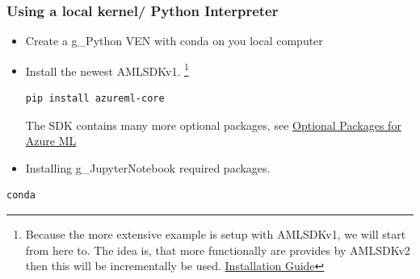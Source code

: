 \subsubsection{Using a local kernel/ Python Interpreter}

\begin{itemize}
	\item Create a \gls{g_Python} \gls{VEN} with conda on you local computer
	\item Install the newest \gls{AMLSDKv1}.
	\footnote{
	Because the more extensive example is setup with \gls{AMLSDKv1}, we will start from here to. The idea is, that more functionally are provides by \gls{AMLSDKv2} then this will be incrementally be used. \href{https://learn.microsoft.com/en-us/python/api/overview/azure/ml/install?view=azure-ml-py}{Installation Guide}
}
	\begin{lstlisting}[style=CMD, caption={Installing Azure ML SDK core package},captionpos=b]
		pip install azureml-core
	\end{lstlisting}
	The \gls{SDK} contains many more optional packages, see \href{https://learn.microsoft.com/en-us/python/api/overview/azure/ml/install?view=azure-ml-py}{Optional Packages for Azure ML}
	\item Installing \gls{g_JupyterNotebook} required packages.
\end{itemize}

\begin{lstlisting}[style=CMD, caption={Installing Azure ML SDK core package},captionpos=b]
	conda 
\end{lstlisting}
